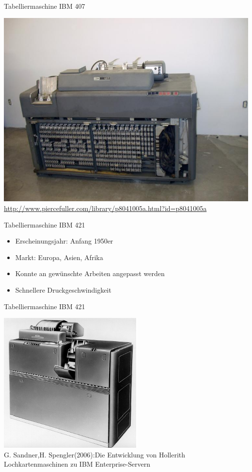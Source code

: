 \documentclass[EU2]{beamer}
\begin{document}
\begin{frame}[plain]{Tabelliermaschine IBM 407}
\begin{center}
    \includegraphics[height=0.95\textheight]{IBM407}\\
    \tiny{\url{http://www.piercefuller.com/library/p8041005a.html?id=p8041005a}}
  \end{center}
\end{frame}

\begin{frame}{Tabelliermaschine IBM 421}
    \begin{itemize}
      \item Erscheinungsjahr: Anfang 1950er
      \item Markt: Europa, Asien, Afrika
      \item Konnte an gewünschte Arbeiten angepasst werden
      \item Schnellere Druckgeschwindigkeit
    \end{itemize}
\end{frame}

\begin{frame}[plain]{Tabelliermaschine IBM 421}
\begin{center}
    \includegraphics[height=0.95\textheight]{IBM421}\\
    \tiny{G. Sandner,H. Spengler(2006):Die Entwicklung von Hollerith Lochkartenmaschinen zu IBM Enterprise-Servern}
  \end{center}
\end{frame}
\end{document}
